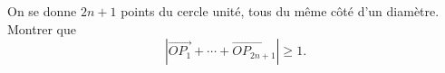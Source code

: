 On se donne $2n + 1$ points du cercle unité, tous du même côté d'un diamètre. Montrer que
\[ |\overrightarrow{OP_1} + \cdots + \overrightarrow{OP_{2n+1}}| \geq 1. \]
